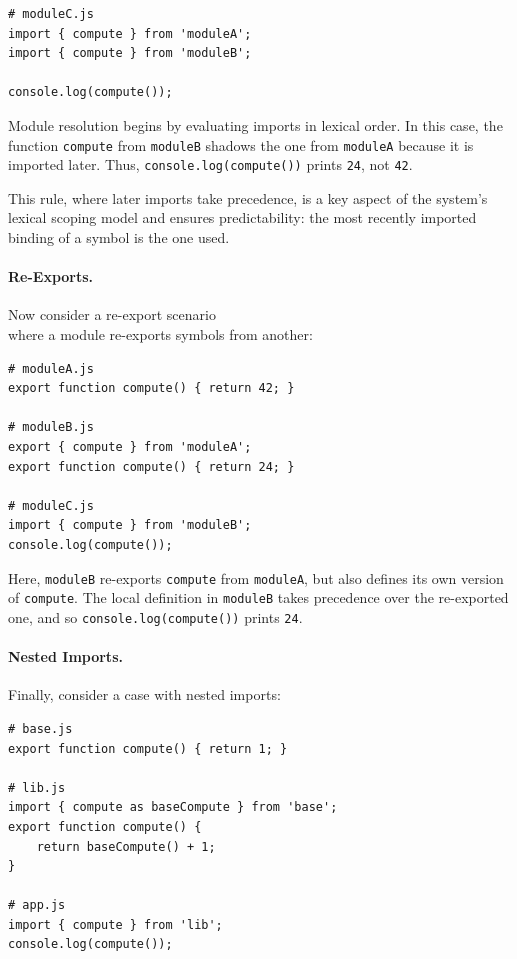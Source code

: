 \documentclass[sigplan,screen]{acmart}
\begin{document}
\begin{verbatim}
# moduleC.js
import { compute } from 'moduleA';
import { compute } from 'moduleB';

console.log(compute());
\end{verbatim}

Module resolution begins by evaluating imports in lexical order. In this case, the function \texttt{compute} from \texttt{moduleB} shadows the one from \texttt{moduleA} because it is imported later. Thus, \texttt{console.log(compute())} prints \texttt{24}, not \texttt{42}.

This rule, where later imports take precedence, is a key aspect of the system's lexical scoping model and ensures predictability: the most recently imported binding of a symbol is the one used.

\paragraph{Re-Exports.}

Now consider a re-export scenario \\where a module re-exports symbols from another:

\begin{verbatim}
# moduleA.js
export function compute() { return 42; }

# moduleB.js
export { compute } from 'moduleA';
export function compute() { return 24; }

# moduleC.js
import { compute } from 'moduleB';
console.log(compute());
\end{verbatim}

Here, \texttt{moduleB} re-exports \texttt{compute} from \texttt{moduleA}, but also defines its own version of \texttt{compute}. The local definition in \texttt{moduleB} takes precedence over the re-exported one, and so \texttt{console.log(compute())} prints \texttt{24}.

\paragraph{Nested Imports.}

Finally, consider a case with nested imports:

\begin{verbatim}
# base.js
export function compute() { return 1; }

# lib.js
import { compute as baseCompute } from 'base';
export function compute() {
	return baseCompute() + 1;
}

# app.js
import { compute } from 'lib';
console.log(compute());
\end{verbatim}
\end{document}
